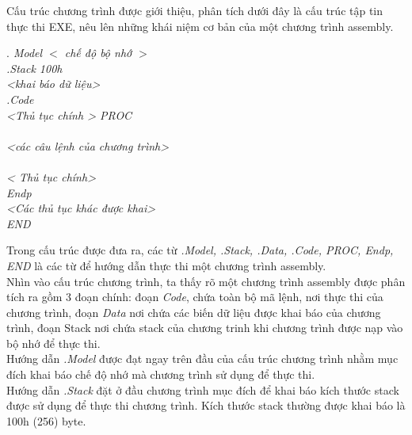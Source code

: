 Cấu trúc chương trình được giới thiệu, phân tích dưới đây là cấu trúc tập tin thực thi EXE, nêu lên những khái niệm cơ bản của một chương trình assembly. \\
	\begin{normalsize}
			\setlength{\parindent}{1cm}		
			\renewcommand{\rmdefault}{cmss}
			\textit {$.$ Model	$<$ chế độ bộ nhớ $>$	}		\\	
			\indent  \textit{.Stack 100h } \\			
			\indent \textit{<khai báo dữ liệu>} \\			
			\indent \textit{.Code}\\
			\indent \textit{<Thủ tục chính > PROC}\\ \\
			\indent \textit{<các câu lệnh của chương trình>}\\ \\
			\indent \textit{< Thủ tục chính> } \\
			\indent \textit{Endp}\\
			\indent \textit{<Các thủ tục khác được khai>}\\
			\indent \textit{END}\\
	\end{normalsize}
	
	Trong cấu trúc được đưa ra, các từ \textit {.Model, .Stack, .Data, .Code, PROC, Endp, END} là các từ để hướng dẫn thực thi một chương trình assembly. \\

Nhìn vào cấu trúc chương trình, ta thấy rõ một chương trình assembly được phân tích ra gồm 3 đoạn chính: đoạn \textit{Code}, chứa toàn bộ mã lệnh, nơi thực thi của chương trình, đoạn \textit{Data} nơi chứa các biến dữ liệu được khai báo của chương trình, đoạn Stack nơi chứa stack của chương trinh khi chương trình được nạp vào bộ nhớ để thực thi.\\

Hướng dẫn \textit{.Model} được đạt ngay trên đầu của cấu trúc chương trình nhằm mục đích khai báo chế độ nhớ mà chương trình sử dụng để thực thi.\\

Hướng dẫn \textit{.Stack} đặt ở đầu chương trình mục đích để khai báo kích thước stack được sử dụng để thực thi chương trình. Kích thước stack thường được khai báo là 100h (256) byte.\\

